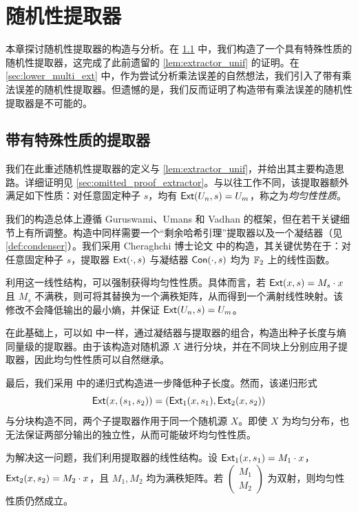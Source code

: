 \section{随机性提取器}\label{sec:extractor}

本章探讨随机性提取器的构造与分析。在 \ref{sec:extractor_special} 中，我们构造了一个具有特殊性质的随机性提取器，这完成了此前遗留的 \cref{lem:extractor_unif} 的证明。在 \ref{sec:lower_multi_ext} 中，作为尝试分析乘法误差的自然想法，我们引入了带有乘法误差的随机性提取器。但遗憾的是，我们反而证明了构造带有乘法误差的随机性提取器是不可能的。

\subsection{带有特殊性质的提取器}\label{sec:extractor_special}

我们在此重述随机性提取器的定义与 \cref{lem:extractor_unif}，并给出其主要构造思路。详细证明见 \ref{sec:omitted_proof_extractor}。与以往工作不同，该提取器额外满足如下性质：对任意固定种子 $s$，均有 $\mathsf{Ext}(U_n, s) = U_m$，称之为\emph{均匀性性质}。

\Extractor*

\ExtractorUniform*

我们的构造总体上遵循 Guruswami、Umans 和 Vadhan \cite{GUV_extractor} 的框架，但在若干关键细节上有所调整。构造中同样需要一个“剩余哈希引理”提取器以及一个凝结器（见 \cref{def:condenser}）。我们采用 Cheraghchi 博士论文 \cite{Cheraghchi11_phd_thesis} 中的构造，其关键优势在于：对任意固定种子 $s$，提取器 $\mathsf{Ext}(\cdot, s)$ 与凝结器 $\mathsf{Con}(\cdot, s)$ 均为 $\mathbb{F}_2$ 上的线性函数。

利用这一线性结构，可以强制获得均匀性性质。具体而言，若 $\mathsf{Ext}(x, s) = M_s \cdot x$ 且 $M_s$ 不满秩，则可将其替换为一个满秩矩阵，从而得到一个满射线性映射。该修改不会降低输出的最小熵，并保证 $\mathsf{Ext}(U_n, s) = U_m$。

在此基础上，可以如 \cite{GUV_extractor} 中一样，通过凝结器与提取器的组合，构造出种子长度与熵同量级的提取器。由于该构造对随机源 $X$ 进行分块，并在不同块上分别应用子提取器，因此均匀性性质可以自然继承。

最后，我们采用 \cite{GUV_extractor} 中的递归式构造进一步降低种子长度。然而，该递归形式
$$
\mathsf{Ext}(x, (s_1, s_2)) = (\mathsf{Ext}_1(x, s_1), \mathsf{Ext}_2(x, s_2))
$$
与分块构造不同，两个子提取器作用于同一个随机源 $X$。即使 $X$ 为均匀分布，也无法保证两部分输出的独立性，从而可能破坏均匀性性质。

为解决这一问题，我们利用提取器的线性结构。设 $\mathsf{Ext}_1(x, s_1) = M_1 \cdot x$，$\mathsf{Ext}_2(x, s_2) = M_2 \cdot x$，且 $M_1, M_2$ 均为满秩矩阵。若 $\begin{pmatrix} M_1 \\ M_2 \end{pmatrix}$ 为双射，则均匀性性质仍然成立。

